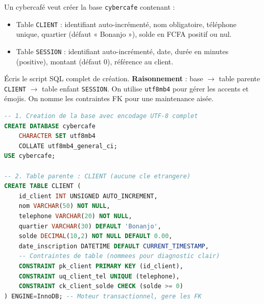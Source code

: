 \documentclass[11pt]{article}
\begin{document}
\begin{exoresolu}
Un cybercafé veut créer la base \texttt{cybercafe} contenant :
\begin{itemize}
\item Table \texttt{CLIENT} : identifiant auto-incrémenté, nom obligatoire, téléphone unique, quartier (défaut « Bonanjo »), solde en FCFA positif ou nul.
\item Table \texttt{SESSION} : identifiant auto-incrémenté, date, durée en minutes (positive), montant (défaut 0), référence au client.
\end{itemize}
Écris le script SQL complet de création.
\tcblower
\textbf{Raisonnement} : base $\to$ table parente \texttt{CLIENT} $\to$ table enfant \texttt{SESSION}. On utilise \texttt{utf8mb4} pour gérer les accents et émojis. On nomme les contraintes FK pour une maintenance aisée.
\begin{lstlisting}[language=SQL]
-- 1. Creation de la base avec encodage UTF-8 complet
CREATE DATABASE cybercafe
    CHARACTER SET utf8mb4
    COLLATE utf8mb4_general_ci;
USE cybercafe;

-- 2. Table parente : CLIENT (aucune cle etrangere)
CREATE TABLE CLIENT (
    id_client INT UNSIGNED AUTO_INCREMENT,
    nom VARCHAR(50) NOT NULL,
    telephone VARCHAR(20) NOT NULL,
    quartier VARCHAR(30) DEFAULT 'Bonanjo',
    solde DECIMAL(10,2) NOT NULL DEFAULT 0.00,
    date_inscription DATETIME DEFAULT CURRENT_TIMESTAMP,
    -- Contraintes de table (nommees pour diagnostic clair)
    CONSTRAINT pk_client PRIMARY KEY (id_client),
    CONSTRAINT uq_client_tel UNIQUE (telephone),
    CONSTRAINT ck_client_solde CHECK (solde >= 0)
) ENGINE=InnoDB; -- Moteur transactionnel, gere les FK


\end{lstlisting}
\end{exoresolu}
\end{document}
